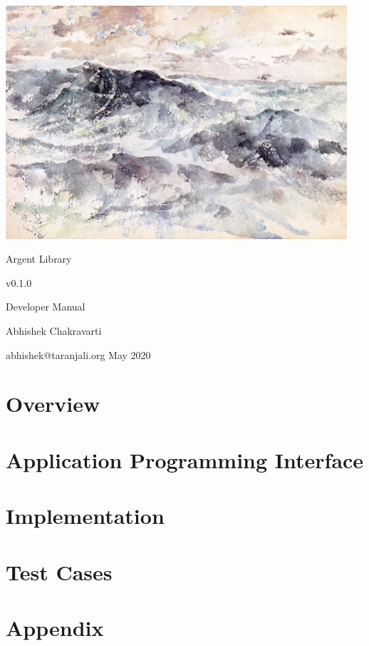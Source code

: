 \documentclass[a4paper, 10pt, twocolumn]{report}
\begin{document}
\begin{titlepage}
  \centering
  \includegraphics[width=0.95\textwidth]{the-great-sea.jpg}\par \vspace{1em}
  \Huge Argent Library \par \vspace{0.5em} \large v0.1.0 \par \vspace{0.5em} 
      \LARGE Developer Manual \par \vspace{5em} Abhishek Chakravarti \par
      \vspace{0.5em} \small abhishek@taranjali.org \vfill \large May 2020
\end{titlepage}

\tableofcontents
\listoffigures
\listoftables

\part{Overview}
\part{Application Programming Interface}
\part{Implementation}
\part{Test Cases}
\part{Appendix}

\clearpage
\printindex
\end{document}
